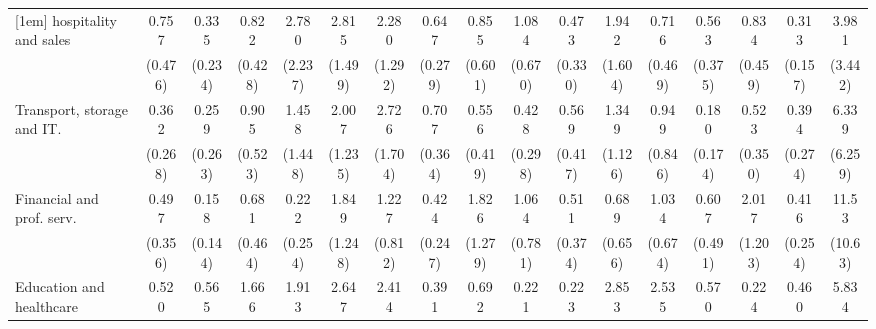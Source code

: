 {\begin{tabular}{l*{16}{c}}
[1em]
hospitality and sales&       0.757         &       0.335         &       0.822         &       2.780         &       2.815         &       2.280         &       0.647         &       0.855         &       1.084         &       0.473         &       1.942         &       0.716         &       0.563         &       0.834         &       0.313\sym{*}  &       3.981         \\
                    &     (0.476)         &     (0.234)         &     (0.428)         &     (2.237)         &     (1.499)         &     (1.292)         &     (0.279)         &     (0.601)         &     (0.670)         &     (0.330)         &     (1.604)         &     (0.469)         &     (0.375)         &     (0.459)         &     (0.157)         &     (3.442)         \\
[1em]
Transport, storage and IT.&       0.362         &       0.259         &       0.905         &       1.458         &       2.007         &       2.726         &       0.707         &       0.556         &       0.428         &       0.569         &       1.349         &       0.949         &       0.180         &       0.523         &       0.394         &       6.339         \\
                    &     (0.268)         &     (0.263)         &     (0.523)         &     (1.448)         &     (1.235)         &     (1.704)         &     (0.364)         &     (0.419)         &     (0.298)         &     (0.417)         &     (1.126)         &     (0.846)         &     (0.174)         &     (0.350)         &     (0.274)         &     (6.259)         \\
[1em]
Financial and prof. serv.&       0.497         &       0.158\sym{*}  &       0.681         &       0.222         &       1.849         &       1.227         &       0.424         &       1.826         &       1.064         &       0.511         &       0.689         &       1.034         &       0.607         &       2.017         &       0.416         &       11.53\sym{**} \\
                    &     (0.356)         &     (0.144)         &     (0.464)         &     (0.254)         &     (1.248)         &     (0.812)         &     (0.247)         &     (1.279)         &     (0.781)         &     (0.374)         &     (0.656)         &     (0.674)         &     (0.491)         &     (1.203)         &     (0.254)         &     (10.63)         \\
[1em]
Education and healthcare&       0.520         &       0.565         &       1.666         &       1.913         &       2.647         &       2.414         &       0.391         &       0.692         &       0.221         &       0.223         &       2.853         &       2.535         &       0.570         &       0.224         &       0.460         &       5.834         \\

\end{tabular}}
